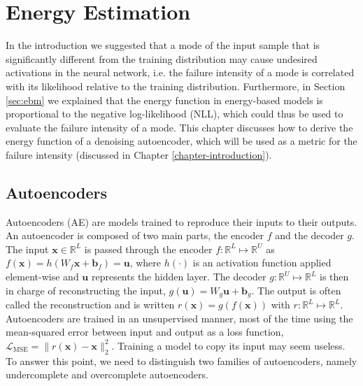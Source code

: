 \chapter{Energy Estimation} 
\label{chapter-energy-estimation} 

In the introduction we suggested that a mode of the input sample that is significantly different from the training distribution may cause undesired activations in the neural network, i.e. the failure intensity of a mode is correlated with its likelihood relative to the training distribution. Furthermore, in Section \ref{sec:ebm} we explained that the energy function in energy-based models is proportional to the negative log-likelihood (NLL), which could thus be used to evaluate the failure intensity of a mode. This chapter discusses how to derive the energy function of a denoising autoencoder, which will be used as a metric for the failure intensity (discussed in Chapter \ref{chapter-introduction}).


\section{Autoencoders}

Autoencoders (AE) are models trained to reproduce their inputs to their outputs. An autoencoder is composed of two main parts, the encoder $f$ and the decoder $g$. The input $\mathbf{x} \in  \mathbb{R}^L$ is passed through the encoder $f: \mathbb{R}^L \mapsto \mathbb{R}^U$ as $f(\mathbf{x}) = h(W_f\mathbf{x} + \mathbf{b}_f) = \mathbf{u}$, where $h(\cdot)$ is an activation function applied element-wise and $ \mathbf{u}$ represents the hidden layer. The decoder $g: \mathbb{R}^U \mapsto \mathbb{R}^L$ is then in charge of reconstructing the input, $g(\mathbf{u}) = W_g\mathbf{u} + \mathbf{b}_g$. The output is often called the reconstruction and is written  $r(\mathbf{x}) = g(f(\mathbf{x}))$ with $r: \mathbb{R}^L \mapsto \mathbb{R}^L$. Autoencoders are trained in an unsupervised manner, most of the time using the mean-squared error between input and output as a loss function, $\mathcal{L}_{\text{MSE}} = \lVert r(\mathbf{x}) - \mathbf{x} \rVert_2^2$. Training a model to copy its input may seem useless. To answer this point, we need to distinguish two families of autoencoders, namely undercomplete and overcomplete autoencoders.

